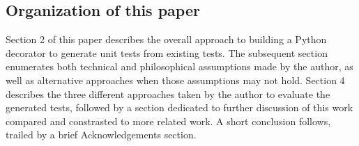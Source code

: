 \subsection{Organization of this paper}\label{sec:intro-5}

Section 2 of this paper describes the overall approach to building a
Python decorator to generate unit tests from existing tests. The subsequent
section enumerates both technical and philosophical assumptions made by the
author, as well as alternative approaches when those assumptions may not hold.
Section 4 describes the three different approaches taken by the author to 
evaluate the generated tests, followed by a section dedicated to further 
discussion of this work compared and constrasted to more related work.  A short
conclusion follows, trailed by a brief Acknowledgements section.

